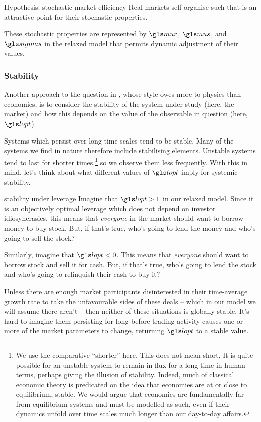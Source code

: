 \begin{keypts}{Hypothesis: stochastic market efficiency}
Real markets self-organise such that
\be
{}
\ee
is an attractive point for their stochastic properties.
\end{keypts}
These stochastic properties are represented by $\mur$, $\mus$, and $\sigmas$ in the relaxed model that permits dynamic adjustment of their values. %

\subsubsection{Stability}
Another approach to the question in , whose style owes more to physics than economics, is to consider the stability of the system under study (here, the market) and how this depends on the value of the observable in question (here, $\lopt$). 

Systems which persist over long time scales tend to be stable. Many of the systems we find in nature therefore include stabilising elements. Unstable systems tend to last for shorter times,\footnote{We use the comparative ``shorter'' here. This does not mean short. It is quite possible for an unstable system to remain in flux for a long time in human terms, perhaps giving the illusion of stability. Indeed, much of classical economic theory is predicated on the idea that economies are at or close to equilibrium, \ie stable. We would argue that economies are fundamentally far-from-equilibrium systems and must be modelled as such, even if their dynamics unfold over time scales much longer than our day-to-day affairs.} so we observe them less frequently. With this in mind, let's think about what different values of $\lopt$ imply for systemic stability.

\begin{thoughtex}{stability under leverage}
Imagine that $\lopt>1$ in our relaxed model. Since it is an objectively optimal leverage which does not depend on investor idiosyncrasies, this means that \textit{everyone} in the market should want to borrow money to buy stock. But, if that's true, who's going to lend the money and who's going to sell the stock?

Similarly, imagine that $\lopt<0$. This means that \textit{everyone} should want to borrow stock and sell it for cash. But, if that's true, who's going to lend the stock and who's going to relinquish their cash to buy it?

Unless there are enough market participants disinterested in their time-average growth rate to take the unfavourable sides of these deals -- which in our model we will assume there aren't -- then neither of these situations is globally stable. It's hard to imagine them persisting for long before trading activity causes one or more of the market parameters to change, returning $\lopt$ to a stable value.
\end{thoughtex}


